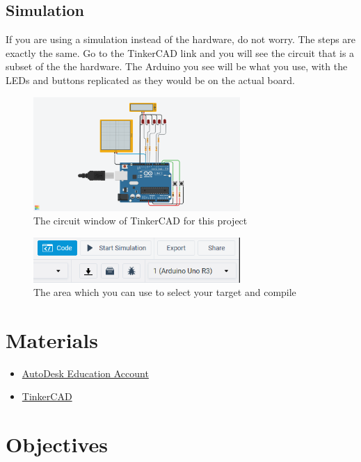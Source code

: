 \documentclass{article}
\begin{document}
    \subsection{Simulation}
        If you are using a simulation instead of the hardware, do not worry.  The steps are exactly the same. Go to the TinkerCAD link and you will see the circuit that is a subset of the the hardware. The Arduino you see will be what you use, with the LEDs and buttons replicated as they would be on the actual board.
        \begin{figure}[ht]
            \centering
            \includegraphics[width = 0.7\textwidth]{images/TinkerCADWires.png}
            \caption{The circuit window of TinkerCAD for this project}
        \end{figure}
        
        \begin{figure}[ht]
            \centering
            \includegraphics[width = 0.7\textwidth]{images/TinkerCadCode.png}
            \caption{The area which you can use to select your target and compile}
        \end{figure}
        \pagebreak
\section{Materials}
\begin{itemize}
	\item \href{https://www.autodesk.com/education/edu-software/overview}{AutoDesk Education Account}
	\item \href{https://www.tinkercad.com/things/aeAzdEiZjZr}{TinkerCAD}
\end{itemize}
\section{Objectives}
\end{document}

